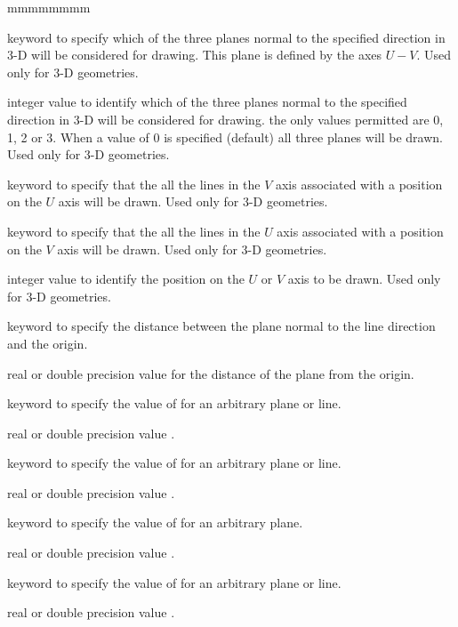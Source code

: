 \begin{ListeDeDescription}{mmmmmmmm}
\item[\moc{PLAN}] keyword to specify which of the three planes normal to the specified direction in 3-D will be considered for drawing. This plane is defined
by the axes $U-V$. Used only for 3-D geometries.

\item[\dusa{iplan} ] integer value to identify which of the three planes normal to the specified direction in 3-D will be considered for drawing. the only
values permitted are 0, 1, 2 or 3. When a value of 0 is specified (default) all three planes will be drawn. Used only for 3-D geometries.

\item[\moc{U}] keyword to specify that the all the lines in the $V$ axis associated with a position on the $U$ axis will be drawn. Used only for 3-D geometries.

\item[\moc{V}] keyword to specify that the all the lines in the $U$ axis associated with a position on the $V$ axis will be drawn. Used only for 3-D geometries.

\item[\dusa{iuv}] integer value to identify the position on the $U$ or $V$ axis to be drawn. Used only for 3-D geometries.

\item[\moc{DIST}] keyword to specify the distance between the plane normal to the line direction and the origin.

\item[\dusa{dist} ] real or double precision value for the distance of the plane from the origin.

\item[\moc{A}] keyword to specify the value of  for an arbitrary plane or line.

\item[\dusa{a} ] real or double precision value .

\item[\moc{B}] keyword to specify the value of  for an arbitrary plane or line.

\item[\dusa{b} ] real or double precision value .

\item[\moc{C}] keyword to specify the value of  for an arbitrary plane.

\item[\dusa{b} ] real or double precision value .

\item[\moc{D}] keyword to specify the value of  for an arbitrary plane or line.

\item[\dusa{d} ] real or double precision value .
\end{ListeDeDescription}

\eject

